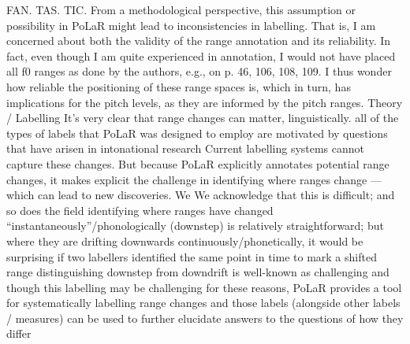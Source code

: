 {}FAN. TAS. TIC.\markdownRendererUlItemEnd 
\markdownRendererUlEndTight \markdownRendererUlItemEnd 
\markdownRendererUlEndTight \markdownRendererUlItemEnd 
\markdownRendererUlItem From a methodological perspective, this assumption or possibility in PoLaR might lead to inconsistencies in labelling. That is, I am concerned about both the validity of the range annotation and its reliability. In fact, even though I am quite experienced in annotation, I would not have placed all f0 ranges as done by the authors, e.g., on p. 46, 106, 108, 109. I thus wonder how reliable the positioning of these range spaces is, which in turn, has implications for the pitch levels, as they are informed by the pitch ranges.\markdownRendererUlItemEnd 
\markdownRendererUlItem Theory / Labelling\markdownRendererInterblockSeparator
{}\markdownRendererUlBeginTight
\markdownRendererUlItem It’s very clear that range changes can matter, linguistically.\markdownRendererUlItemEnd 
\markdownRendererUlItem all of the types of labels that PoLaR was designed to employ are motivated by questions that have arisen in intonational research\markdownRendererInterblockSeparator
{}\markdownRendererUlBeginTight
\markdownRendererUlItem Current labelling systems cannot capture these changes. But because PoLaR explicitly annotates potential range changes, it makes explicit the challenge in identifying where ranges change — which can lead to new discoveries.\markdownRendererUlItemEnd 
\markdownRendererUlItem We\markdownRendererUlItemEnd 
\markdownRendererUlEndTight \markdownRendererUlItemEnd 
\markdownRendererUlItem We acknowledge that this is difficult; and so does the field\markdownRendererInterblockSeparator
{}\markdownRendererUlBeginTight
\markdownRendererUlItem identifying where ranges have changed “instantaneously”/phonologically (downstep) is relatively straightforward; but where they are drifting downwards continuously/phonetically, it would be surprising if two labellers identified the same point in time to mark a shifted range\markdownRendererUlItemEnd 
\markdownRendererUlItem distinguishing downstep from downdrift is well-known as challenging\markdownRendererInterblockSeparator
{}\markdownRendererUlBeginTight
\markdownRendererUlItem and though this labelling may be challenging for these reasons, PoLaR provides a tool for systematically labelling range changes and those labels (alongside other labels / measures) can be used to further elucidate answers to the questions of how they differ\markdownRendererUlItemEnd 
\markdownRendererUlEndTight \markdownRendererUlItemEnd 
\markdownRendererUlEndTight \markdownRendererUlItemEnd 
